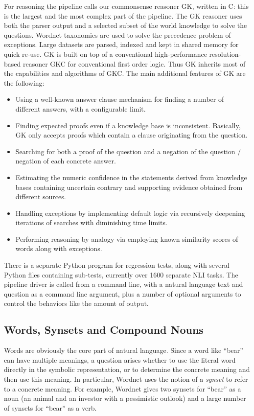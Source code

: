 \documentclass[runningheads]{llncs}
\begin{document}
For reasoning the pipeline
calls our commonsense reasoner GK, written in C: this is the largest
and the most complex part of the pipeline. 
The GK reasoner uses both the parser output and a selected subset of the world knowledge to solve the questions. 
Wordnet taxonomies are used to solve the precedence problem of exceptions. Large datasets
are parsed, indexed and kept in shared memory for quick re-use. 
GK is built on top of a conventional high-performance resolution-based reasoner GKC  
\cite{ref_tammet_2} 
for conventional first order logic. 
Thus GK inherits most of the capabilities and algorithms of GKC. 
The main additional features of GK are the following:
\begin{itemize}
  \item Using a well-known answer clause mechanism for finding a number of different answers, 
  with a configurable limit.
  \item Finding expected proofs even if a knowledge base is inconsistent. 
  Basically, GK only accepts proofs which contain a clause originating from the question.
  \item Searching for both a proof of the question and a negation of the
  question / negation of each concrete answer.
  \item Estimating the numeric confidence in the statements 
  derived from knowledge bases containing uncertain contrary and supporting evidence
  obtained from different sources.
  \item Handling exceptions by implementing default logic via recursively deepening
   iterations of searches with diminishing time limits.
  \item Performing reasoning by analogy via employing known similarity scores of 
  words along with exceptions.
\end{itemize}

There is a separate Python program for regression tests, along with
several Python files containing sub-tests, currently over 1600 separate NLI
tasks. The pipeline driver is called from a command line, with a natural
language text and question as a command line argument, plus a number of optional
arguments to control the behaviors like the amount of output.

\subsection{Words, Synsets and Compound Nouns}

Words are obviously the core part of natural language. Since a word like ``bear'' can have
multiple meanings, a question arises whether to use the literal word directly in the symbolic
representation, or to determine the concrete meaning and then use this meaning. In particular,
Wordnet \cite{fellbaum1998wordnet} uses the notion of a {\em synset} to refer to a concrete meaning. For example, Wordnet
gives two synsets for ``bear'' as a noun (an animal and an investor with a pessimistic outlook) 
and a large number of synsets for ``bear'' as a verb.
\end{document}
